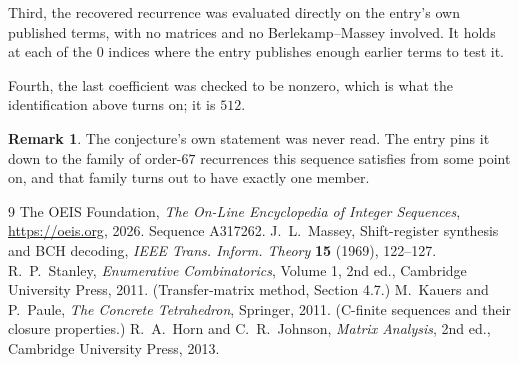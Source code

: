\documentclass[11pt,a4paper]{article}
\theoremstyle{plain}
\theoremstyle{definition}
\newtheorem{remark}[theorem]{Remark}
\begin{document}
Third, the recovered recurrence was evaluated directly on the entry's own published terms, with
no matrices and no Berlekamp--Massey involved. It holds at each of the $0$ indices where
the entry publishes enough earlier terms to test it.

Fourth, the last coefficient was checked to be nonzero, which is what the identification above
turns on; it is $512$.

\begin{remark}
The conjecture's own statement was never read. The entry pins it down to the family of
order-$67$ recurrences this sequence satisfies from some point on, and that family turns
out to have exactly one member.
\end{remark}

\begin{thebibliography}{9}
 The OEIS Foundation, \emph{The On-Line Encyclopedia of Integer
Sequences}, \url{https://oeis.org}, 2026. Sequence A317262.
 J.~L.~Massey, Shift-register synthesis and BCH decoding, \emph{IEEE
Trans. Inform. Theory} \textbf{15} (1969), 122--127.
 R.~P.~Stanley, \emph{Enumerative Combinatorics}, Volume 1, 2nd ed.,
Cambridge University Press, 2011. (Transfer-matrix method, Section 4.7.)
 M.~Kauers and P.~Paule, \emph{The Concrete Tetrahedron}, Springer, 2011.
(C-finite sequences and their closure properties.)
 R.~A.~Horn and C.~R.~Johnson, \emph{Matrix Analysis}, 2nd ed., Cambridge
University Press, 2013.
\end{thebibliography}
\end{document}
